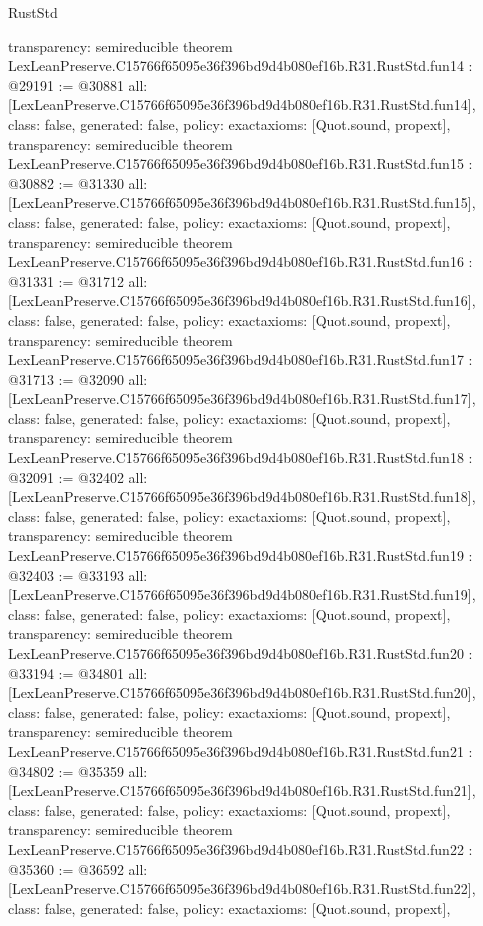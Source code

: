 \begin{lexlean}{RustStd}
\begin{coremodule}
{  transparency: semireducible
}
theorem LexLeanPreserve.C15766f65095e36f396bd9d4b080ef16b.R31.RustStd.fun14 : @29191 := @30881 {
  all: [LexLeanPreserve.C15766f65095e36f396bd9d4b080ef16b.R31.RustStd.fun14],
  class: false,
  generated: false,
  policy: exact{axioms: [Quot.sound, propext]},
  transparency: semireducible
}
theorem LexLeanPreserve.C15766f65095e36f396bd9d4b080ef16b.R31.RustStd.fun15 : @30882 := @31330 {
  all: [LexLeanPreserve.C15766f65095e36f396bd9d4b080ef16b.R31.RustStd.fun15],
  class: false,
  generated: false,
  policy: exact{axioms: [Quot.sound, propext]},
  transparency: semireducible
}
theorem LexLeanPreserve.C15766f65095e36f396bd9d4b080ef16b.R31.RustStd.fun16 : @31331 := @31712 {
  all: [LexLeanPreserve.C15766f65095e36f396bd9d4b080ef16b.R31.RustStd.fun16],
  class: false,
  generated: false,
  policy: exact{axioms: [Quot.sound, propext]},
  transparency: semireducible
}
theorem LexLeanPreserve.C15766f65095e36f396bd9d4b080ef16b.R31.RustStd.fun17 : @31713 := @32090 {
  all: [LexLeanPreserve.C15766f65095e36f396bd9d4b080ef16b.R31.RustStd.fun17],
  class: false,
  generated: false,
  policy: exact{axioms: [Quot.sound, propext]},
  transparency: semireducible
}
theorem LexLeanPreserve.C15766f65095e36f396bd9d4b080ef16b.R31.RustStd.fun18 : @32091 := @32402 {
  all: [LexLeanPreserve.C15766f65095e36f396bd9d4b080ef16b.R31.RustStd.fun18],
  class: false,
  generated: false,
  policy: exact{axioms: [Quot.sound, propext]},
  transparency: semireducible
}
theorem LexLeanPreserve.C15766f65095e36f396bd9d4b080ef16b.R31.RustStd.fun19 : @32403 := @33193 {
  all: [LexLeanPreserve.C15766f65095e36f396bd9d4b080ef16b.R31.RustStd.fun19],
  class: false,
  generated: false,
  policy: exact{axioms: [Quot.sound, propext]},
  transparency: semireducible
}
theorem LexLeanPreserve.C15766f65095e36f396bd9d4b080ef16b.R31.RustStd.fun20 : @33194 := @34801 {
  all: [LexLeanPreserve.C15766f65095e36f396bd9d4b080ef16b.R31.RustStd.fun20],
  class: false,
  generated: false,
  policy: exact{axioms: [Quot.sound, propext]},
  transparency: semireducible
}
theorem LexLeanPreserve.C15766f65095e36f396bd9d4b080ef16b.R31.RustStd.fun21 : @34802 := @35359 {
  all: [LexLeanPreserve.C15766f65095e36f396bd9d4b080ef16b.R31.RustStd.fun21],
  class: false,
  generated: false,
  policy: exact{axioms: [Quot.sound, propext]},
  transparency: semireducible
}
theorem LexLeanPreserve.C15766f65095e36f396bd9d4b080ef16b.R31.RustStd.fun22 : @35360 := @36592 {
  all: [LexLeanPreserve.C15766f65095e36f396bd9d4b080ef16b.R31.RustStd.fun22],
  class: false,
  generated: false,
  policy: exact{axioms: [Quot.sound, propext]},
}
\end{coremodule}
\end{lexlean}
